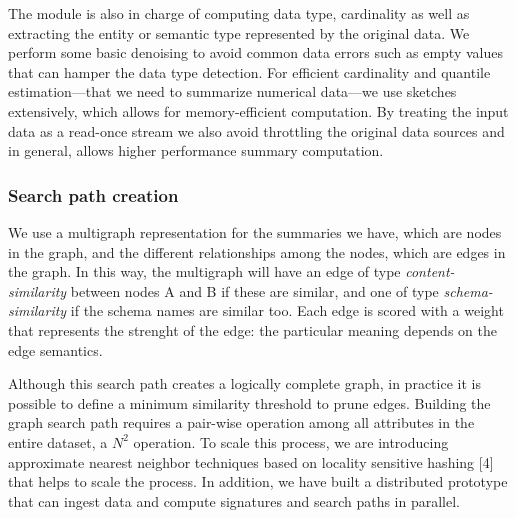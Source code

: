 The module is also in charge of computing data type, cardinality as well as
extracting the entity or semantic type represented by the original data. We
perform some basic denoising to avoid common data errors such as empty values
that can hamper the data type detection. For efficient cardinality and quantile
estimation---that we need to summarize numerical data---we use sketches
extensively, which allows for memory-efficient computation. By treating the
input data as a read-once stream we also avoid throttling the original data
sources and in general, allows higher performance summary computation.

\subsubsection{Search path creation}

We use a multigraph representation for the summaries we have, which are nodes in
the graph, and the different relationships among the nodes, which are edges in
the graph. In this way, the multigraph will have an edge of type
\emph{content-similarity} between nodes A and B if these are similar, and one of
type \emph{schema-similarity} if the schema names are similar too. Each edge is
scored with a weight that represents the strenght of the edge: the particular
meaning depends on the edge semantics.

Although this search path creates a logically complete graph, in practice it is
possible to define a minimum similarity threshold to prune edges. Building the
graph search path requires a pair-wise operation among all attributes in the
entire dataset, a $N^2$ operation. To scale this process, we are introducing
approximate nearest neighbor techniques based on locality sensitive hashing [4]
that helps to scale the process. In addition, we have built a distributed
prototype that can ingest data and compute signatures and search paths in
parallel.


